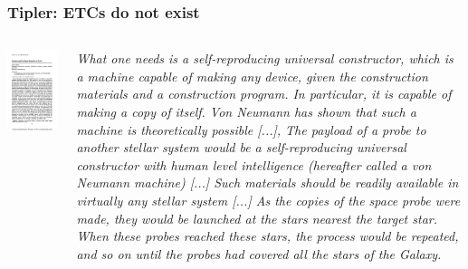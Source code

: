 
\begin{frame}
\frametitle{Tipler: ETCs do not exist}

\begin{columns}
\includegraphics[scale=0.28]{tiplerpaper}

{\em What one needs is a self-reproducing universal constructor, which is a machine capable of making any device, given the construction materials and a construction program. In particular, it is capable of making a copy of itself. Von Neumann has shown that such a machine is theoretically possible [...], The payload of a probe to another stellar system would be a self-reproducing universal constructor with human level intelligence (hereafter called a von Neumann machine)  [...] Such materials should be readily available in virtually any stellar system [...] As the copies of the space probe were made, they would be launched at the stars nearest the target star. When these probes reached these stars, the process would be repeated, and so on until the probes had covered all the stars of the Galaxy. }\end{columns}
\end{frame}


